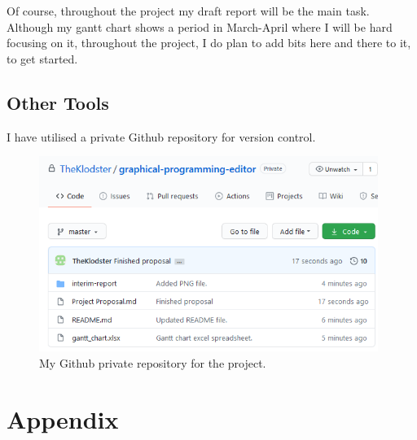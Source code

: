 \documentclass[a4paper, 12pt]{article}
\begin{document}
            Of course, throughout the project my draft report will be the main task. Although
            my gantt chart shows a period in March-April where I will be hard focusing on it,
            throughout the project, I do plan to add bits here and there to it, to get started.

        \subsection{Other Tools}
            I have utilised a private Github repository for version control.

            \begin{figure}[h]
                \centering
                \includegraphics[width=110mm]{github.png}
                \caption{My Github private repository for the project.}
            \end{figure}
    
    \section{Appendix}
\end{document}
